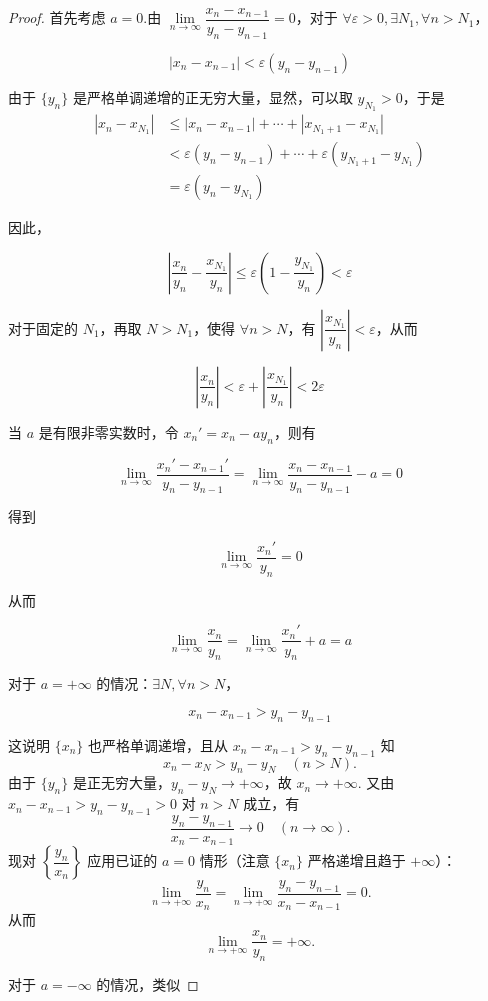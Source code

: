\begin{proof}
	首先考虑 $a = 0$.由 $\lim\limits_{n \to \infty} \dfrac{x_n - x_{n-1}}{y_n - y_{n-1}} = 0$，对于 $\forall \varepsilon > 0, \exists N_1, \forall n > N_1$，
	
	$$ |x_n - x_{n-1}| < \varepsilon (y_n - y_{n-1} ) $$
	
	由于 $\{y_n\}$ 是严格单调递增的正无穷大量，显然，可以取 $y_{N_1} > 0$，于是
	\begin{align*}
		|x_n - x_{N_1}| & \leqslant |x_n - x_{n-1}| + \cdots + |x_{N_1+1} - x_{N_1}| \\
		& < \varepsilon (y_n - y_{n-1}) + \cdots + \varepsilon (y_{N_1+1} - y_{N_1}) \\
		& = \varepsilon (y_n - y_{N_1})
	\end{align*}
	
	因此，
	
	$$ \left| \frac{x_n}{y_n} - \frac{x_{N_1}}{y_n} \right| \leqslant \varepsilon \left(1 - \frac{y_{N_1}}{y_n}\right) < \varepsilon $$
	
	对于固定的 $N_1$，再取 $N > N_1$，使得 $\forall n > N$，有 $\left| \dfrac{x_{N_1}}{y_n} \right| < \varepsilon$，从而
	
	$$ \left| \frac{x_n}{y_n} \right| <\varepsilon+ \left| \frac{x_{N_1}}{y_n} \right| <  2\varepsilon $$
	
	当 $a$ 是有限非零实数时，令 $x_n' = x_n - a y_n$，则有
	
	$$ \lim_{n \to \infty} \frac{x_n' - x_{n-1}'}{y_n - y_{n-1}} = \lim_{n \to \infty} \frac{x_n - x_{n-1} }{y_n - y_{n-1}} - a= 0 $$
	
	得到
	
	$$ \lim_{n \to \infty} \frac{x_n'}{y_n} = 0 $$
	
	从而
	
	$$ \lim_{n \to \infty} \frac{x_n}{y_n} = \lim_{n \to \infty} \frac{x_n'}{y_n} + a = a $$
	
	对于 $a = +\infty$ 的情况：$\exists N, \forall n > N$，
	
	$$ x_n - x_{n-1} > y_n - y_{n-1} $$
	
	这说明 $\{x_n\}$ 也严格单调递增，且从 $x_n - x_{n-1} > y_n - y_{n-1}$ 知
	\[
	x_n - x_N > y_n - y_N \quad (n > N).
	\]
	由于 $\{y_n\}$ 是正无穷大量，$y_n - y_N \to +\infty$，故 $x_n \to +\infty$.
	又由 $x_n - x_{n-1} > y_n - y_{n-1} > 0$ 对 $n > N$ 成立，有
	\[
	\frac{y_n - y_{n-1}}{x_n - x_{n-1}} \to 0 \quad (n\to\infty).
	\]
	现对 $\left\{\dfrac{y_n}{x_n}\right\}$ 应用已证的 $a=0$ 情形（注意 $\{x_n\}$ 严格递增且趋于 $+\infty$）：
	\[
	\lim_{n \to +\infty} \frac{y_n}{x_n}
	= \lim_{n \to +\infty} \frac{y_n - y_{n-1}}{x_n - x_{n-1}} = 0.
	\]
	从而
	\[
	\lim_{n \to +\infty} \frac{x_n}{y_n} = +\infty.
	\]
	
	对于 $a = -\infty$ 的情况，类似
\end{proof}
